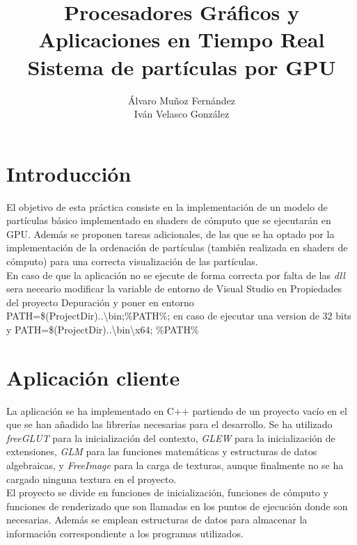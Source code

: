 \documentclass[10pt,oneside,a4paper]{article}
\begin{document}
\begin{titlepage}

\title{\Huge Procesadores Gráficos y Aplicaciones en Tiempo Real  \\[0.7in] \LARGE Sistema de partículas por GPU\\[3.6in]}
\date{}
\author{Álvaro Muñoz Fernández\\
Iván Velasco González}
\maketitle
\thispagestyle{empty}
\end{titlepage}

\section{Introducción}
El objetivo de esta práctica consiste en la implementación de un modelo de partículas básico implementado en shaders de cómputo que se ejecutarán en GPU. Además se proponen tareas adicionales, de las que se ha optado por la implementación de la ordenación de partículas (también realizada en shaders de cómputo) para una correcta visualización de las partículas.\\

En caso de que la aplicación no se ejecute de forma correcta por falta de las \textit{dll} sera neceario modificar la variable de entorno de Visual Studio en Propiedades del proyecto \rightarrow Depuración y poner en entorno PATH=\$(ProjectDir)..\textbackslash bin;\%PATH\%; en caso de ejecutar una version de 32 bits y  PATH=\$(ProjectDir)..\textbackslash bin\textbackslash x64;
\%PATH\%

\section{Aplicación cliente}
La aplicación se ha implementado en C++ partiendo de un proyecto vacío en el que se han añadido las librerías necesarias para el desarrollo. Se ha utilizado \textit{freeGLUT} para la inicialización del contexto, \textit{GLEW} para la inicialización de extensiones, \textit{GLM} para las funciones matemáticas y estructuras de datos algebraicas, y \textit{FreeImage} para la carga de texturas, aunque finalmente no se ha cargado ninguna textura en el proyecto.\\

El proyecto se divide en funciones de inicialización, funciones de cómputo y funciones de renderizado que son llamadas en los puntos de ejecución donde son necesarias. Además se emplean estructuras de datos para almacenar la información correspondiente a los programas utilizados.\\
\end{document}
